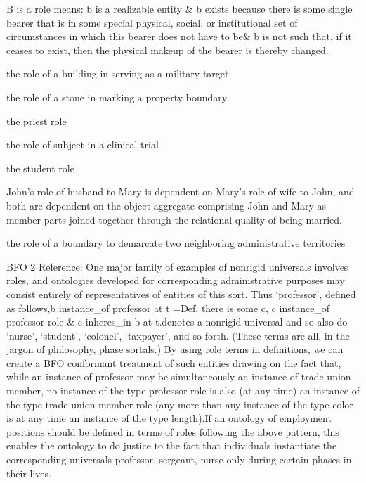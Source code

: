 \documentclass[letterpaper,10pt,english]{sphinxmanual}
\begin{document}
\begin{sphinxShadowBox}

\sphinxAtStartPar
B is a role means: b is a realizable entity \& b exists because there is some single bearer that is in some special physical, social, or institutional set of circumstances in which this bearer does not have to be\& b is not such that, if it ceases to exist, then the physical make\sphinxhyphen{}up of the bearer is thereby changed.
\end{sphinxShadowBox}

\begin{sphinxShadowBox}

\sphinxAtStartPar
the role of a building in serving as a military target

\sphinxAtStartPar
the role of a stone in marking a property boundary

\sphinxAtStartPar
the priest role

\sphinxAtStartPar
the role of subject in a clinical trial

\sphinxAtStartPar
the student role

\sphinxAtStartPar
John’s role of husband to Mary is dependent on Mary’s role of wife to John, and both are dependent on the object aggregate comprising John and Mary as member parts joined together through the relational quality of being married.

\sphinxAtStartPar
the role of a boundary to demarcate two neighboring administrative territories
\end{sphinxShadowBox}

\begin{sphinxShadowBox}

\sphinxAtStartPar
BFO 2 Reference: One major family of examples of non\sphinxhyphen{}rigid universals involves roles, and ontologies developed for corresponding administrative purposes may consist entirely of representatives of entities of this sort. Thus ‘professor’, defined as follows,b instance\_of professor at t =Def. there is some c, c instance\_of professor role \& c inheres\_in b at t.denotes a non\sphinxhyphen{}rigid universal and so also do ‘nurse’, ‘student’, ‘colonel’, ‘taxpayer’, and so forth. (These terms are all, in the jargon of philosophy, phase sortals.) By using role terms in definitions, we can create a BFO conformant treatment of such entities drawing on the fact that, while an instance of professor may be simultaneously an instance of trade union member, no instance of the type professor role is also (at any time) an instance of the type trade union member role (any more than any instance of the type color is at any time an instance of the type length).If an ontology of employment positions should be defined in terms of roles following the above pattern, this enables the ontology to do justice to the fact that individuals instantiate the corresponding universals \textendash{}  professor, sergeant, nurse \textendash{} only during certain phases in their lives.
\end{sphinxShadowBox}
\end{document}
